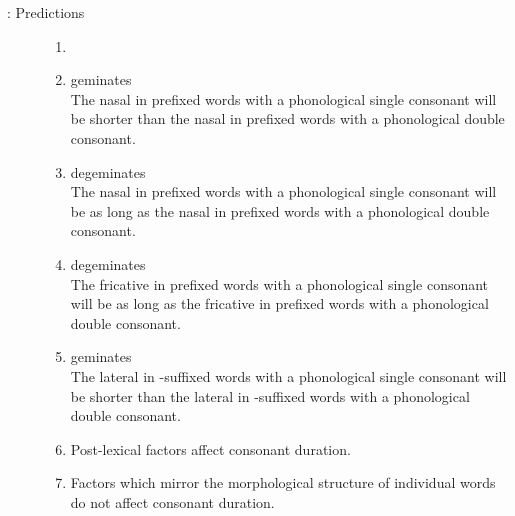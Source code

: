 \newpage\largerpage
\begin{description}\item[: Predictions]
\begin{enumerate}[leftmargin=*]
	\item[]
	\item {} geminates \\
	The nasal in prefixed words with a phonological single consonant will be shorter than the nasal in prefixed words with a phonological double consonant. %
	
	\item {} degeminates \\
	The nasal in prefixed words with a phonological single consonant will be as long as the nasal in  prefixed words with a phonological double consonant.%
	
	
	
	\item {} degeminates \\
	The fricative in prefixed words with a phonological single consonant will be as long as the fricative in prefixed words with a phonological double consonant. %
	
	
	
	\item {} geminates \\
	The lateral in -suffixed words with a phonological single consonant will be shorter than the lateral in -suffixed words with a phonological double consonant.%
	
	\item Post-lexical factors affect consonant duration.
	
	\item Factors which mirror the morphological structure of individual words do not affect consonant duration.
	
\end{enumerate}
\end{description}

